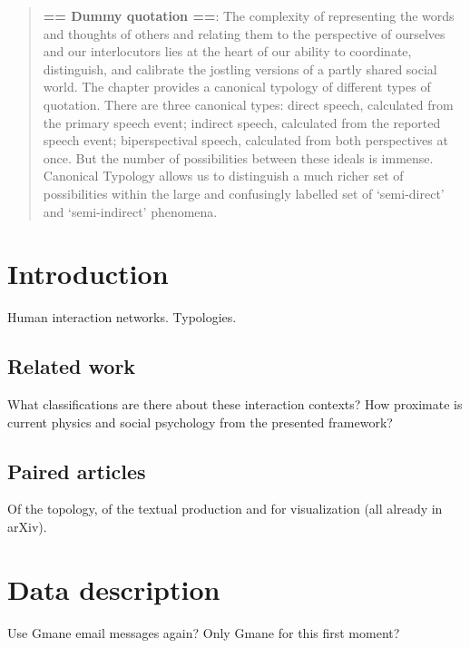 \documentclass[%
 aip,
 jmp,%
 amsmath,amssymb,
 reprint,%
]{revtex4-1}
\begin{document}
\maketitle

\begin{quotation}
	{\bf == Dummy quotation ==}:
The complexity of representing the words and thoughts of others and relating them to the perspective of ourselves and our interlocutors lies at the heart of our ability to coordinate, distinguish, and calibrate the jostling versions of a partly shared social world. The chapter provides a canonical typology of different types of quotation. There are three canonical types: direct speech, calculated from the primary speech event; indirect speech, calculated from the reported speech event; biperspectival speech, calculated from both perspectives at once. But the number of possibilities between these ideals is immense. Canonical Typology allows us to distinguish a much richer set of possibilities within the large and confusingly labelled set of ‘semi-direct’ and ‘semi-indirect’ phenomena.
\end{quotation}


\section{Introduction}
Human interaction networks.
Typologies.

\subsection{Related work}
What classifications are there about these interaction contexts?
How proximate is current physics and social psychology from the presented framework?

\subsection{Paired articles}
Of the topology, of the textual production and for visualization (all already in arXiv).

\section{Data description}
Use Gmane email messages again? Only Gmane for this first moment?
\end{document}
